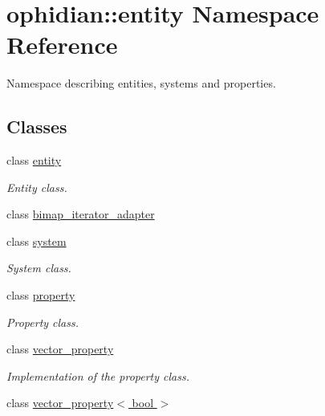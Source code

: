 \hypertarget{namespaceophidian_1_1entity}{\section{ophidian\-:\-:entity Namespace Reference}
\label{namespaceophidian_1_1entity}
}


Namespace describing entities, systems and properties.  


\subsection*{Classes}
\begin{DoxyCompactItemize}
\item 
class \hyperlink{classophidian_1_1entity_1_1entity}{entity}
\begin{DoxyCompactList}\small\item\em Entity class. \end{DoxyCompactList}\item 
class \hyperlink{classophidian_1_1entity_1_1bimap__iterator__adapter}{bimap\-\_\-iterator\-\_\-adapter}
\item 
class \hyperlink{classophidian_1_1entity_1_1system}{system}
\begin{DoxyCompactList}\small\item\em System class. \end{DoxyCompactList}\item 
class \hyperlink{classophidian_1_1entity_1_1property}{property}
\begin{DoxyCompactList}\small\item\em Property class. \end{DoxyCompactList}\item 
class \hyperlink{classophidian_1_1entity_1_1vector__property}{vector\-\_\-property}
\begin{DoxyCompactList}\small\item\em Implementation of the property class. \end{DoxyCompactList}\item 
class \hyperlink{classophidian_1_1entity_1_1vector__property_3_01bool_01_4}{vector\-\_\-property$<$ bool $>$}
\end{DoxyCompactItemize}

